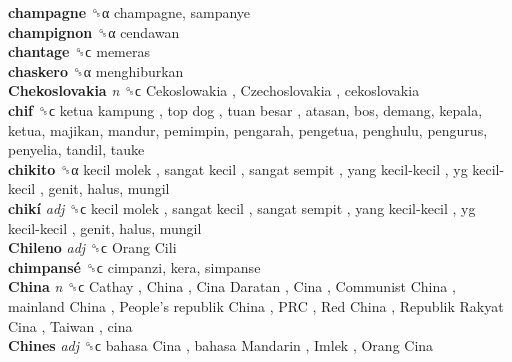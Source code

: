 \textbf{champagne} ␝α  champagne, sampanye  \\
\textbf{champignon} ␝α  cendawan  \\
\textbf{chantage} ␝ϲ  memeras  \\
\textbf{chaskero} ␝α  menghiburkan  \\
\textbf{Chekoslovakia} \emph{n}  ␝ϲ   Cekoslowakia ,  Czechoslovakia , cekoslovakia  \\
\textbf{chif} ␝ϲ   ketua kampung ,  top dog ,  tuan besar , atasan, bos, demang, kepala, ketua, majikan, mandur, pemimpin, pengarah, pengetua, penghulu, pengurus, penyelia, tandil, tauke  \\
\textbf{chikito} ␝α   kecil molek ,  sangat kecil ,  sangat sempit ,  yang kecil-kecil ,  yg kecil-kecil , genit, halus, mungil  \\
\textbf{chikí} \emph{adj}  ␝ϲ   kecil molek ,  sangat kecil ,  sangat sempit ,  yang kecil-kecil ,  yg kecil-kecil , genit, halus, mungil  \\
\textbf{Chileno} \emph{adj}  ␝ϲ   Orang Cili   \\
\textbf{chimpansé} ␝ϲ  cimpanzi, kera, simpanse  \\
\textbf{China} \emph{n}  ␝ϲ   Cathay ,  China ,  Cina Daratan ,  Cina ,  Communist China ,  mainland China ,  People’s republik China ,  PRC ,  Red China ,  Republik Rakyat Cina ,  Taiwan , cina  \\
\textbf{Chines} \emph{adj}  ␝ϲ   bahasa Cina ,  bahasa Mandarin ,  Imlek ,  Orang Cina   \\
